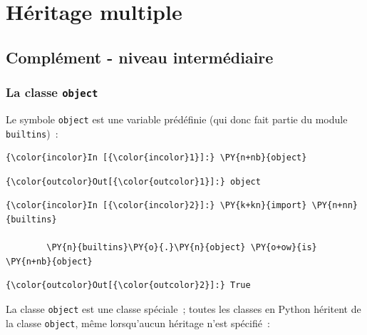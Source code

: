     \hypertarget{huxe9ritage-multiple}{%
\section{Héritage multiple}\label{huxe9ritage-multiple}}

    \hypertarget{compluxe9ment---niveau-intermuxe9diaire}{%
\subsection{Complément - niveau
intermédiaire}\label{compluxe9ment---niveau-intermuxe9diaire}}

    \hypertarget{la-classe-object}{%
\subsubsection{\texorpdfstring{La classe
\texttt{object}}{La classe object}}\label{la-classe-object}}

    Le symbole \texttt{object} est une variable prédéfinie (qui donc fait
partie du module \texttt{builtins})~:

    \begin{Verbatim}[commandchars=\\\{\}]
{\color{incolor}In [{\color{incolor}1}]:} \PY{n+nb}{object}
\end{Verbatim}


\begin{Verbatim}[commandchars=\\\{\}]
{\color{outcolor}Out[{\color{outcolor}1}]:} object
\end{Verbatim}
            
    \begin{Verbatim}[commandchars=\\\{\}]
{\color{incolor}In [{\color{incolor}2}]:} \PY{k+kn}{import} \PY{n+nn}{builtins}
        
        \PY{n}{builtins}\PY{o}{.}\PY{n}{object} \PY{o+ow}{is} \PY{n+nb}{object}
\end{Verbatim}


\begin{Verbatim}[commandchars=\\\{\}]
{\color{outcolor}Out[{\color{outcolor}2}]:} True
\end{Verbatim}
            
    La classe \texttt{object} est une classe spéciale~; toutes les classes
en Python héritent de la classe \texttt{object}, même lorsqu'aucun
héritage n'est spécifié~:

